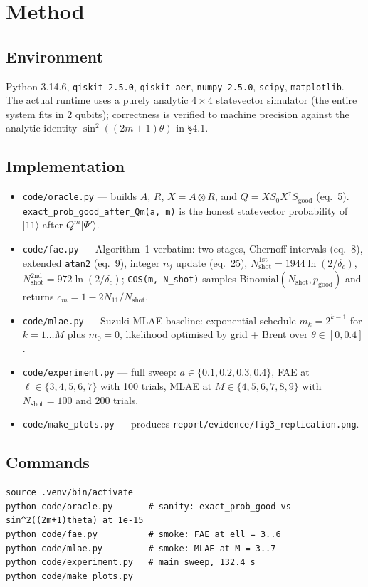 \documentclass[11pt]{article}
\begin{document}
\section{Method}

\subsection{Environment}
Python 3.14.6, \texttt{qiskit 2.5.0}, \texttt{qiskit-aer}, \texttt{numpy 2.5.0}, \texttt{scipy}, \texttt{matplotlib}. The actual runtime uses a purely analytic $4\times 4$ statevector simulator (the entire system fits in 2 qubits); correctness is verified to machine precision against the analytic identity $\sin^{2}((2m+1)\theta)$ in \S4.1.

\subsection{Implementation}
\begin{itemize}
    \item \texttt{code/oracle.py} --- builds $A$, $R$, $X = A \otimes R$, and $Q = X S_{0} X^{\dagger} S_{\mathrm{good}}$ (eq.~5). \texttt{exact\_prob\_good\_after\_Qm(a, m)} is the honest statevector probability of $|11\rangle$ after $Q^{m}|\Psi'\rangle$.
    \item \texttt{code/fae.py} --- Algorithm~1 verbatim: two stages, Chernoff intervals (eq.~8), extended \texttt{atan2} (eq.~9), integer $n_{j}$ update (eq.~25), $N_{\mathrm{shot}}^{1\mathrm{st}} = 1944\ln(2/\delta_{c})$, $N_{\mathrm{shot}}^{2\mathrm{nd}} = 972\ln(2/\delta_{c})$; \texttt{COS(m, N\_shot)} samples $\mathrm{Binomial}(N_{\mathrm{shot}}, p_{\mathrm{good}})$ and returns $c_{m} = 1 - 2N_{11}/N_{\mathrm{shot}}$.
    \item \texttt{code/mlae.py} --- Suzuki MLAE baseline: exponential schedule $m_{k} = 2^{k-1}$ for $k = 1\dots M$ plus $m_{0} = 0$, likelihood optimised by grid + Brent over $\theta \in [0, 0.4]$.
    \item \texttt{code/experiment.py} --- full sweep: $a \in \{0.1, 0.2, 0.3, 0.4\}$, FAE at $\ell \in \{3,4,5,6,7\}$ with 100 trials, MLAE at $M \in \{4,5,6,7,8,9\}$ with $N_{\mathrm{shot}} = 100$ and 200 trials.
    \item \texttt{code/make\_plots.py} --- produces \texttt{report/evidence/fig3\_replication.png}.
\end{itemize}

\subsection{Commands}
\begin{lstlisting}
source .venv/bin/activate
python code/oracle.py       # sanity: exact_prob_good vs sin^2((2m+1)theta) at 1e-15
python code/fae.py          # smoke: FAE at ell = 3..6
python code/mlae.py         # smoke: MLAE at M = 3..7
python code/experiment.py   # main sweep, 132.4 s
python code/make_plots.py
\end{lstlisting}
\end{document}
